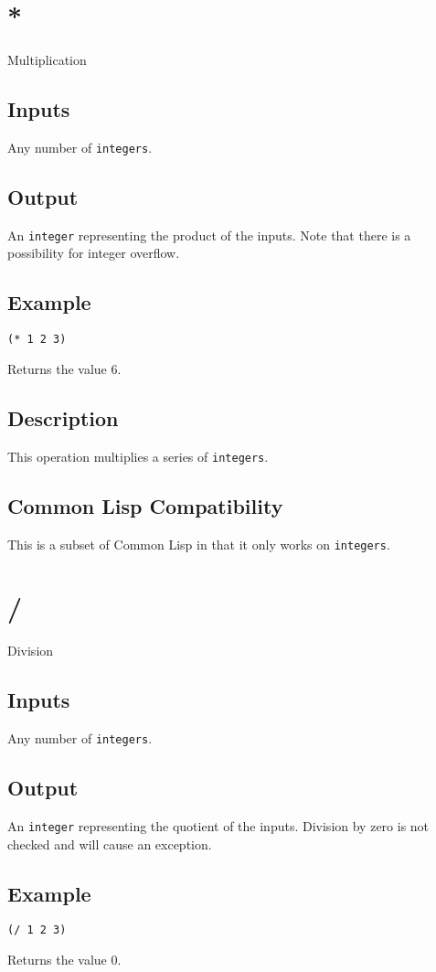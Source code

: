 \documentclass[10pt, openany]{book}
\newcommand{\datatype}[1]{\texttt{#1}}
\newcommand{\cl}{Common Lisp}
\begin{document}
\section{*}
Multiplication
\subsection{Inputs}
Any number of \datatype{integers}.
\subsection{Output}
An \datatype{integer} representing the product of the inputs.  Note that there is a possibility for integer overflow.
\subsection{Example}
\begin{lstlisting}
(* 1 2 3)
\end{lstlisting}
Returns the value 6.
\subsection{Description}
This operation multiplies a series of \datatype{integers}.
\subsection{Common Lisp Compatibility}
This is a subset of \cl{} in that it only works on \datatype{integers}.

\section{/}
Division
\subsection{Inputs}
Any number of \datatype{integers}.
\subsection{Output}
An \datatype{integer} representing the quotient of the inputs.  Division by zero is not checked and will cause an exception.
\subsection{Example}
\begin{lstlisting}
(/ 1 2 3)
\end{lstlisting}
Returns the value 0.
\end{document}
